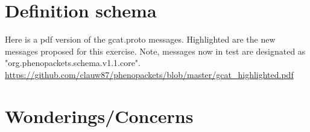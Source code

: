 \documentclass[a4paper, 10pt]{article}
\begin{document}
\section{Definition schema}

Here is a pdf version of the gcat.proto messages. Highlighted are the new messages proposed for this exercise. Note, messages now in test are designated as "org.phenopackets.schema.v1.1.core". \\

\url{https://github.com/clauw87/phenopackets/blob/master/gcat\_highlighted.pdf}

\section{Wonderings/Concerns}
\end{document}
